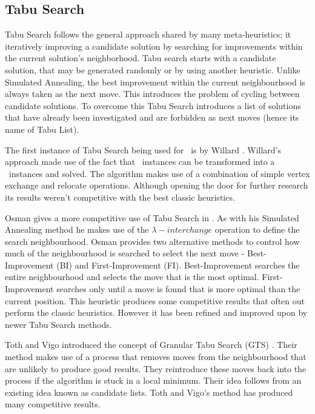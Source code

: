 \subsection{Tabu Search}
\label{sec:ts}

Tabu Search follows the general approach shared by many meta-heuristics; it iteratively improving a candidate solution by searching for improvements within the current solution's neighborhood. Tabu search starts with a candidate solution, that may be generated randomly or by using another heuristic. Unlike Simulated Annealing, the best improvement within the current neighbourhood is always taken as the next move. This introduces the problem of cycling between candidate solutions. To overcome this Tabu Search introduces a list of solutions that have already been investigated and are forbidden as next moves (hence its name of Tabu List). 

The first instance of Tabu Search being used for \VRP\ is by Willard \cite{Willard:1989}. Willard's approach made use of the fact that \VRP\ instances can be transformed into a \MTSP\ instances and solved. The algorithm makes use of a combination of simple vertex exchange and relocate operations. Although opening the door for further research its results weren't competitive with the best classic heuristics. 

Osman gives a more competitive use of Tabu Search in \cite{Osman:1993}. As with his Simulated Annealing method he makes use of the $\lambda-interchange$ operation to define the search neighbourhood. Osman provides two alternative methods to control how much of the neighbourhood is searched to select the next move - Best-Improvement (BI) and First-Improvement (FI). Best-Improvement searches the entire neighbourhood and selects the move that is the most optimal. First-Improvement searches only until a move is found that is more optimal than the current position. This heuristic produces some competitive results that often out perform the classic heuristics. However it has been refined and improved upon by newer Tabu Search methods.

Toth and Vigo introduced the concept of Granular Tabu Search (GTS) \cite{GHL:1998}. Their method makes use of a process that removes moves from the neighbourhood that are unlikely to produce good results. They reintroduce these moves back into the process if the algorithm is stuck in a local minimum. Their idea follows from an existing idea known as candidate lists. Toth and Vigo's method has produced many competitive results.

